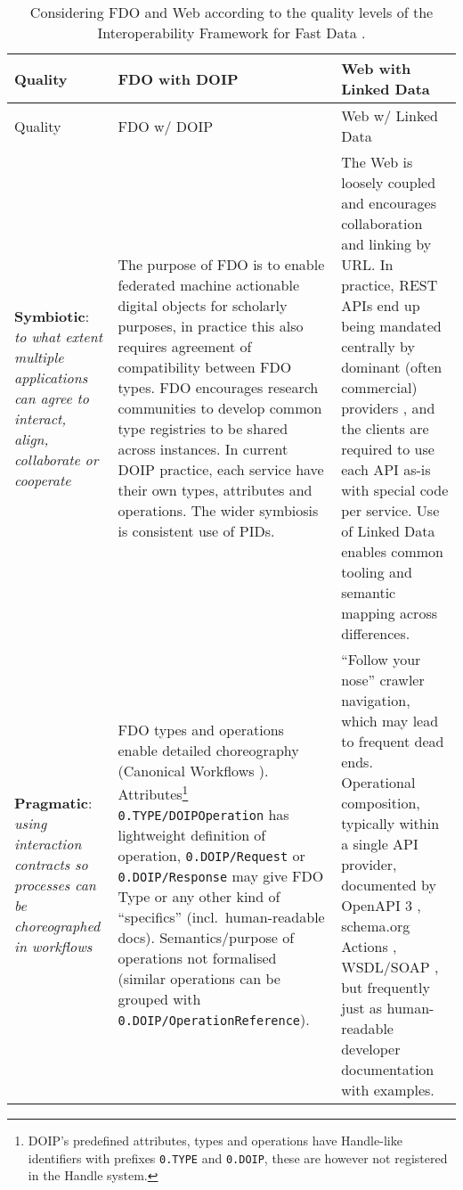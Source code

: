 \renewcommand*{\arraystretch}{1.4}
\begin{longtable}[]{@{}
  >{\raggedright\arraybackslash}p{}
  >{\arraybackslash}p{}
  >{\arraybackslash}p{}@{}}
\caption[Considering FDO and Web according to Interoperability Framework for Fast Data]{Considering FDO and Web according to the quality levels of the Interoperability Framework for Fast Data \cite{Delgado 2016}.
\label{ch3:fdo-web-interoperability-framework}}\tabularnewline
\toprule
Quality & 
FDO with DOIP & 
Web with Linked Data \\
\midrule
\endfirsthead
\toprule
Quality &
FDO w/ DOIP & 
Web w/ Linked Data \\
\midrule
\endhead
\textbf{Symbiotic}: \emph{to what extent multiple applications can agree to interact, align, collaborate or cooperate}
  & The purpose of FDO is to enable federated machine actionable digital objects for scholarly purposes, in practice this also requires agreement of compatibility between FDO types. FDO encourages research communities to develop common type registries to be shared across instances. In current DOIP practice, each service have their own types, attributes and operations. The wider symbiosis is consistent use of PIDs.
  & The Web is loosely coupled and encourages collaboration and linking by URL. In practice, REST APIs \cite{Fielding 2000} end up being mandated centrally by dominant (often commercial) providers \cite{Fielding 2017}, and the clients are required to use each API as-is with special code per service. Use of Linked Data enables common tooling and semantic mapping across differences. \\
\textbf{Pragmatic}: \emph{using interaction contracts so processes can be choreographed in workflows}
  & FDO types and operations enable detailed choreography (Canonical Workflows \cite{CWFR 2021}). Attributes\footnote{
    DOIP's predefined attributes, types and operations have \Gls{Handle}-like identifiers with prefixes \texttt{0.TYPE} and \texttt{0.DOIP}, these are however not registered in the Handle system.
  } \texttt{0.TYPE/DOIPOperation} has lightweight definition of operation, \texttt{0.DOIP/Request} or \texttt{0.DOIP/Response} may give FDO Type or any other kind of ``specifics'' (incl.~human-readable docs). Semantics/purpose of operations not formalised (similar operations can be grouped with \texttt{0.DOIP/OperationReference}).
  & ``Follow your nose'' crawler navigation, which may lead to frequent dead ends. Operational composition, typically within a single API provider, documented by OpenAPI 3 \cite{Miller 2021}, schema.org Actions \cite{schema actions}, WSDL/SOAP \cite{Liu 2007}, but frequently just as human-readable developer documentation with examples. \\

\end{longtable}
